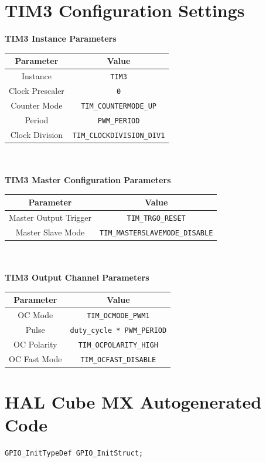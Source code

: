\documentclass[12pt]{report}
\begin{document}
\begin{appendix}
	\chapter{TIM3 Configuration Settings}\label{appendixtim3}
	\textbf{TIM3 Instance Parameters}\\
	\begin{tabular}{|c|c|}
		\hline
		Parameter & Value\\\hline
		Instance & \texttt{TIM3}\\\hline
		Clock Prescaler & \texttt{0}\\\hline
		Counter Mode & \texttt{TIM\_COUNTERMODE\_UP}\\\hline
		Period & \texttt{PWM\_PERIOD}\\\hline
		Clock Division & \texttt{TIM\_CLOCKDIVISION\_DIV1}\\\hline
	\end{tabular}
	\newline
	\\\\
	\textbf{TIM3 Master Configuration Parameters}\\
	\begin{tabular}{|c|c|}
		\hline
		Parameter & Value\\\hline
		Master Output Trigger & \texttt{TIM\_TRGO\_RESET}\\\hline
		Master Slave Mode & \texttt{TIM\_MASTERSLAVEMODE\_DISABLE}\\\hline
	\end{tabular}
	\newline
	\\\\
	\textbf{TIM3 Output Channel Parameters}\\
	\begin{tabular}{|c|c|}
		\hline
		Parameter & Value\\\hline
		OC Mode & \texttt{TIM\_OCMODE\_PWM1}\\\hline
		Pulse & \texttt{duty\_cycle * PWM\_PERIOD}\\\hline
		OC Polarity & \texttt{TIM\_OCPOLARITY\_HIGH}\\\hline
		OC Fast Mode & \texttt{TIM\_OCFAST\_DISABLE}\\\hline
	\end{tabular}	
	\newpage
	
	\chapter{HAL Cube MX Autogenerated Code}\label{mammoth}
	\begin{lstlisting}[basicstyle=\scriptsize\ttfamily]
GPIO_InitTypeDef GPIO_InitStruct;


\end{lstlisting}
\end{appendix}
\end{document}
